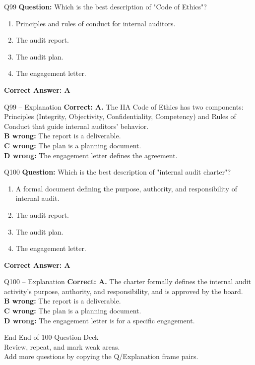 \documentclass[aspectratio=169,10pt]{beamer}
\begin{document}
	\begin{frame}[t]{Q99}
		\small
		\textbf{Question:} Which is the best description of "Code of Ethics"?
		\begin{enumerate}[label=\Alph*.,itemsep=1pt,topsep=2pt]
			\item Principles and rules of conduct for internal auditors.
			\item The audit report.
			\item The audit plan.
			\item The engagement letter.
		\end{enumerate}
		\vspace{4pt}
		\textbf{Correct Answer: A}
	\end{frame}
	
	\begin{frame}[t]{Q99 -- Explanation}
		\small
		\textbf{Correct: A.} The IIA Code of Ethics has two components: Principles (Integrity, Objectivity, Confidentiality, Competency) and Rules of Conduct that guide internal auditors' behavior. \\[4pt]
		\textbf{B wrong:} The report is a deliverable. \\[2pt]
		\textbf{C wrong:} The plan is a planning document. \\[2pt]
		\textbf{D wrong:} The engagement letter defines the agreement.
	\end{frame}
	
	\begin{frame}[t]{Q100}
		\small
		\textbf{Question:} Which is the best description of "internal audit charter"?
		\begin{enumerate}[label=\Alph*.,itemsep=1pt,topsep=2pt]
			\item A formal document defining the purpose, authority, and responsibility of internal audit.
			\item The audit report.
			\item The audit plan.
			\item The engagement letter.
		\end{enumerate}
		\vspace{4pt}
		\textbf{Correct Answer: A}
	\end{frame}
	
	\begin{frame}[t]{Q100 -- Explanation}
		\small
		\textbf{Correct: A.} The charter formally defines the internal audit activity's purpose, authority, and responsibility, and is approved by the board. \\[4pt]
		\textbf{B wrong:} The report is a deliverable. \\[2pt]
		\textbf{C wrong:} The plan is a planning document. \\[2pt]
		\textbf{D wrong:} The engagement letter is for a specific engagement.
	\end{frame}
	
	\begin{frame}{End}
		\centering
		\Large End of 100-Question Deck\\[8pt]
		\normalsize Review, repeat, and mark weak areas.\\[4pt]
		\small Add more questions by copying the Q/Explanation frame pairs.
	\end{frame}
	
\end{document}
